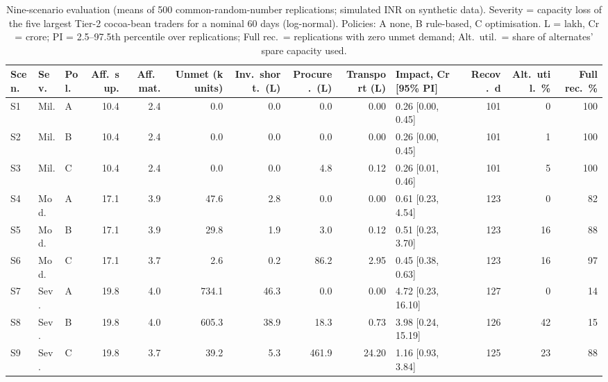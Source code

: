 \begin{table}[t]\centering\caption{Nine-scenario evaluation (means of 500 common-random-number replications; simulated INR on synthetic data). Severity = capacity loss of the five largest Tier-2 cocoa-bean traders for a nominal 60 days (log-normal). Policies: A none, B rule-based, C optimisation. L = lakh, Cr = crore; PI = 2.5--97.5th percentile over replications; Full rec.\ = replications with zero unmet demand; Alt.\ util.\ = share of alternates' spare capacity used.}\label{tab:scen}
\scriptsize\setlength{\tabcolsep}{3pt}\begin{tabular}{lllrrrrrrlrrr}\toprule
Scen. & Sev. & Pol. & Aff.\ sup. & Aff.\ mat. & Unmet (k units) & Inv.\ short.\ (L) & Procure.\ (L) & Transport (L) & Impact, Cr [95\% PI] & Recov.\ d & Alt.\ util.\ \% & Full rec.\ \%\\\midrule
S1 & Mil. & A & 10.4 & 2.4 & 0.0 & 0.0 & 0.0 & 0.00 & 0.26 [0.00, 0.45] & 101 & 0 & 100\\
S2 & Mil. & B & 10.4 & 2.4 & 0.0 & 0.0 & 0.0 & 0.00 & 0.26 [0.00, 0.45] & 101 & 1 & 100\\
S3 & Mil. & C & 10.4 & 2.4 & 0.0 & 0.0 & 4.8 & 0.12 & 0.26 [0.01, 0.46] & 101 & 5 & 100\\\midrule
S4 & Mod. & A & 17.1 & 3.9 & 47.6 & 2.8 & 0.0 & 0.00 & 0.61 [0.23, 4.54] & 123 & 0 & 82\\
S5 & Mod. & B & 17.1 & 3.9 & 29.8 & 1.9 & 3.0 & 0.12 & 0.51 [0.23, 3.70] & 123 & 16 & 88\\
S6 & Mod. & C & 17.1 & 3.7 & 2.6 & 0.2 & 86.2 & 2.95 & 0.45 [0.38, 0.63] & 123 & 16 & 97\\\midrule
S7 & Sev. & A & 19.8 & 4.0 & 734.1 & 46.3 & 0.0 & 0.00 & 4.72 [0.23, 16.10] & 127 & 0 & 14\\
S8 & Sev. & B & 19.8 & 4.0 & 605.3 & 38.9 & 18.3 & 0.73 & 3.98 [0.24, 15.19] & 126 & 42 & 15\\
S9 & Sev. & C & 19.8 & 3.7 & 39.2 & 5.3 & 461.9 & 24.20 & 1.16 [0.93, 3.84] & 125 & 23 & 88\\
\bottomrule\end{tabular}\end{table}